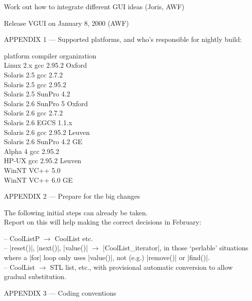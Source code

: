 \documentclass[11pt]{article}
\begin{document}
Work out how to integrate different GUI ideas (Joris, AWF)

Release VGUI on January 8, 2000 (AWF)

\newpage


APPENDIX 1 --- Supported platforms, and who's responsible for nightly build:

  \begin{tabbing}

platform \>	compiler	 \>	organization	\\
Linux 2.x \>	gcc 2.95.2	 \>	Oxford	\\
Solaris 2.5 \>	gcc 2.7.2	 \>		\\
Solaris 2.5 \>	gcc 2.95.2	 \>		\\
Solaris 2.5 \>	SunPro 4.2	 \>		\\
Solaris 2.6 \>	SunPro 5	 \>	Oxford	\\
Solaris 2.6 \>	gcc 2.7.2	 \>		\\
Solaris 2.6 \>	EGCS 1.1.x	 \>		\\
Solaris 2.6 \>	gcc 2.95.2	 \>	Leuven	\\
Solaris 2.6 \>	SunPro 4.2	 \>	GE	\\
Alpha 4 \>	gcc 2.95.2	 \>		\\
HP-UX \>	gcc 2.95.2	 \>	Leuven	\\
WinNT \>	VC++ 5.0	 \>		\\
WinNT \>	VC++ 6.0	 \>	GE	\\

  \end{tabbing}

APPENDIX 2 --- Prepare for the big changes

The following initial steps can already be taken. \\
Report on this will help making the correct decisions in February:

-- CoolListP $\rightarrow$ CoolList etc. \\
-- |reset()|, |next()|, |value()| $\rightarrow$ |CoolList_iterator|, in
those `perlable' situations where a |for| loop only uses |value()|, not (e.g.)
|remove()| or |find()|. \\
-- CoolList $\rightarrow$ STL list, etc., with provisional automatic conversion
to allow gradual substitution.

\vskip1cm

APPENDIX 3 --- Coding conventions
\end{document}
